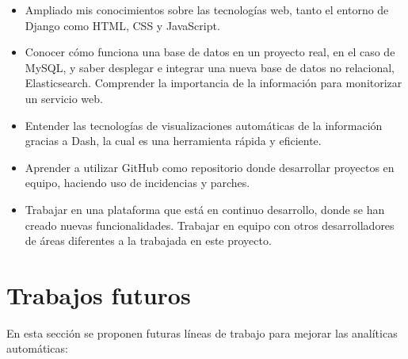 		\begin{itemize}
			\item Ampliado mis conocimientos sobre las tecnologías web, tanto el entorno de Django como HTML, CSS y JavaScript.
			
			\item Conocer cómo funciona una base de datos en un proyecto real, en el caso de MySQL, y saber desplegar e integrar una nueva base de datos no relacional, Elasticsearch. Comprender la importancia de la información para monitorizar un servicio web. 
			
			\item Entender las tecnologías de visualizaciones automáticas de la información gracias a Dash, la cual es una herramienta rápida y eficiente.
			
			\item Aprender a utilizar GitHub como repositorio donde desarrollar proyectos en equipo, haciendo uso de incidencias y parches. 
			
			\item Trabajar en una plataforma que está en continuo desarrollo, donde se han creado nuevas funcionalidades. Trabajar en equipo con otros desarrolladores de áreas diferentes a la trabajada en este proyecto.			
		\end{itemize}
	\section{Trabajos futuros} 
	\label{sec:trabajos_futuros} 

		En esta sección se proponen futuras líneas de trabajo para mejorar las analíticas automáticas:

